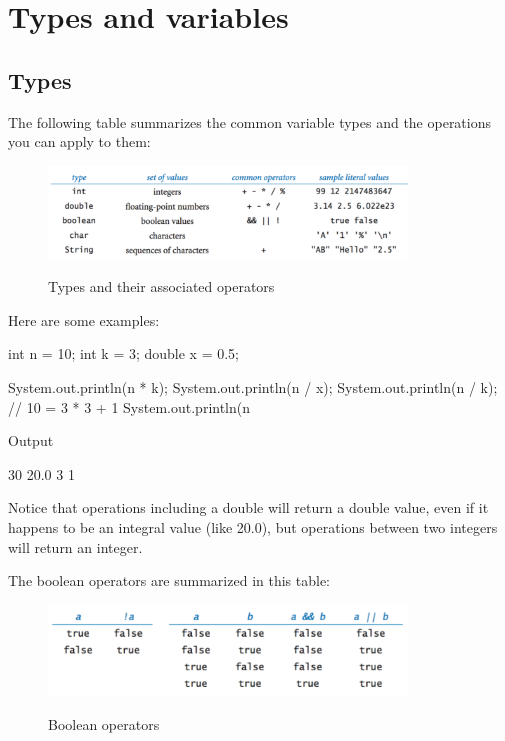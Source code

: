 \section{Types and variables}

\subsection{Types}

The following table summarizes the common variable types and the operations you can apply to them:

\begin{figure}[h]
	\centering
	\includegraphics[width=0.85\textwidth]{images/data_types}
	\label{fig:data_types_reference}
	\caption{Types and their associated operators}
\end{figure}

Here are some examples:

\begin{code}
int n = 10;
int k = 3;
double x = 0.5;

System.out.println(n * k); 
System.out.println(n / x); 
System.out.println(n / k); // 10 = 3 * 3 + 1 
System.out.println(n %
\end{code}

Output
\begin{code}
30
20.0
3
1
\end{code}

Notice that operations including a double will return a double value, even if it happens to be an integral value (like 20.0), but operations between two integers will return an integer.

The boolean operators are summarized in this table:

\begin{figure}[h]
	\centering
	\includegraphics[width=0.85\textwidth]{images/booleans}
	\label{fig:booleans_reference}
    \caption{Boolean operators}

\end{figure}

